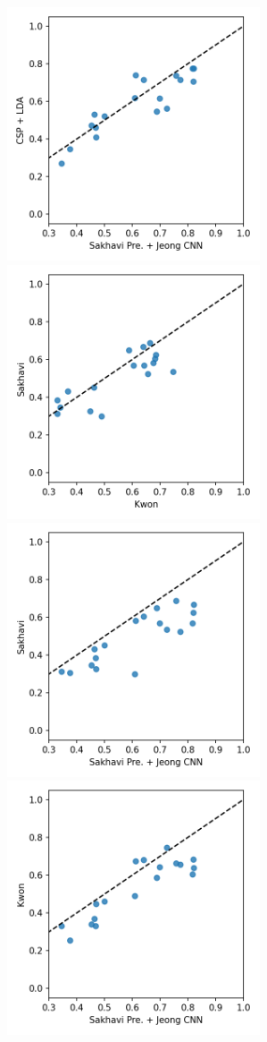 \begin{figure}[h]
\centering
\includegraphics[width=7.5cm]{img/reg-a.png}
\includegraphics[width=7.5cm]{img/reg-b.png}
\includegraphics[width=7.5cm]{img/reg-c.png}
\includegraphics[width=7.5cm]{img/reg-d.png}
\end{figure}
